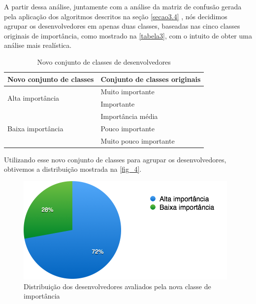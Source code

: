 A partir dessa análise, juntamente com a análise da matriz de confusão gerada pela aplicação dos algoritmos descritos na seção \ref{secao3.4} , nós decidimos agrupar os desenvolvedores em apenas duas classes, baseadas nas cinco classes originais de importância, como mostrado na \autoref{tabela3}, com o intuito de obter uma análise mais realística.


\begin{table}[h]
	\caption{Novo conjunto de classes de desenvolvedores}
	\label{tabela3}
	\def\arraystretch{1.5}
	\begin{tabular}{|p{6cm}|p{8.5cm}|}
		\hline
		\textbf{Novo conjunto de classes}  & \textbf{Conjunto de classes originais} \\ \hline
		\multirow{2}{*}{Alta importância}  & Muito importante                       \\ \cline{2-2} 
		& Importante                             \\ \hline
		\multirow{3}{*}{Baixa importância} & Importância média                      \\ \cline{2-2} 
		& Pouco importante                       \\ \cline{2-2} 
		& Muito pouco importante                 \\ \hline
	\end{tabular}
\end{table}

Utilizando esse novo conjunto de classes para agrupar os desenvolvedores, obtivemos a distribuição mostrada na \autoref{fig_4}.

\begin{figure}[p]
	\centering
	\includegraphics[width=\textwidth]{figs/geral/imagem-classe-alternativa.png}
	\caption{\label{fig_4}Distribuição dos desenvolvedores avaliados pela nova classe de importância}
\end{figure}

